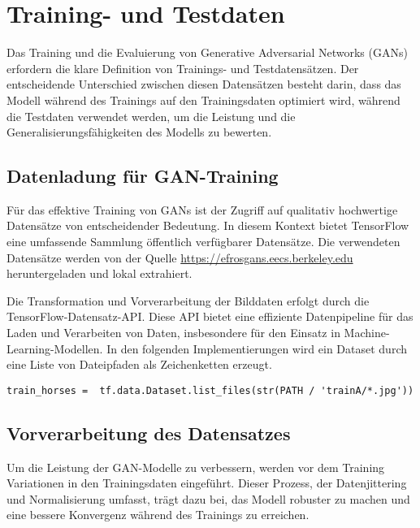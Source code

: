 \section{Training- und Testdaten}
Das Training und die Evaluierung von Generative Adversarial Networks (GANs) erfordern die klare Definition von Trainings- und Testdatensätzen. Der entscheidende Unterschied zwischen diesen Datensätzen besteht darin, dass das Modell während des Trainings auf den Trainingsdaten optimiert wird, während die Testdaten verwendet werden, um die Leistung und die Generalisierungsfähigkeiten des Modells zu bewerten.

\subsection{Datenladung für GAN-Training}
Für das effektive Training von GANs ist der Zugriff auf qualitativ hochwertige Datensätze von entscheidender Bedeutung. In diesem Kontext bietet TensorFlow eine umfassende Sammlung öffentlich verfügbarer Datensätze. Die verwendeten Datensätze werden von der Quelle \url{https://efrosgans.eecs.berkeley.edu} heruntergeladen und lokal extrahiert.



Die Transformation und Vorverarbeitung der Bilddaten erfolgt durch die TensorFlow-Datensatz-API. Diese API bietet eine effiziente Datenpipeline für das Laden und Verarbeiten von Daten, insbesondere für den Einsatz in Machine-Learning-Modellen. In den folgenden Implementierungen wird ein Dataset durch eine Liste von Dateipfaden als Zeichenketten erzeugt.

\begin{lstlisting}[language=pyhaff, caption={Erzeugung eines Tensorflow-Dataset aus CycleGAN Implementierung}, label={cod:createDataset}]
train_horses =  tf.data.Dataset.list_files(str(PATH / 'trainA/*.jpg')) 
\end{lstlisting}

\subsection{Vorverarbeitung des Datensatzes}
Um die Leistung der GAN-Modelle zu verbessern, werden vor dem Training Variationen in den Trainingsdaten eingeführt. Dieser Prozess, der Datenjittering und Normalisierung umfasst, trägt dazu bei, das Modell robuster zu machen und eine bessere Konvergenz während des Trainings zu erreichen.

